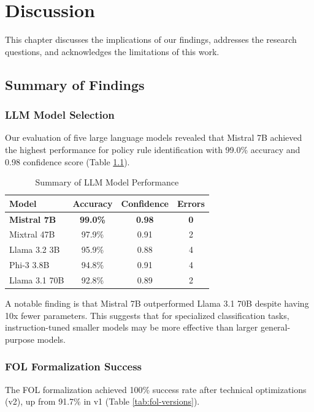 \chapter{Discussion}
\label{ch:discussion}

This chapter discusses the implications of our findings, addresses the research questions, and acknowledges the limitations of this work.

\section{Summary of Findings}

\subsection{LLM Model Selection}

Our evaluation of five large language models revealed that Mistral 7B achieved the highest performance for policy rule identification with 99.0\% accuracy and 0.98 confidence score (Table \ref{tab:model-summary}).

\begin{table}[h]
\centering
\caption{Summary of LLM Model Performance}
\label{tab:model-summary}
\begin{tabular}{|l|c|c|c|}
\hline
\textbf{Model} & \textbf{Accuracy} & \textbf{Confidence} & \textbf{Errors} \\
\hline
\textbf{Mistral 7B} & \textbf{99.0\%} & \textbf{0.98} & \textbf{0} \\
Mixtral 47B & 97.9\% & 0.91 & 2 \\
Llama 3.2 3B & 95.9\% & 0.88 & 4 \\
Phi-3 3.8B & 94.8\% & 0.91 & 4 \\
Llama 3.1 70B & 92.8\% & 0.89 & 2 \\
\hline
\end{tabular}
\end{table}

A notable finding is that Mistral 7B outperformed Llama 3.1 70B despite having 10x fewer parameters. This suggests that for specialized classification tasks, instruction-tuned smaller models may be more effective than larger general-purpose models.

\subsection{FOL Formalization Success}

The FOL formalization achieved 100\% success rate after technical optimizations (v2), up from 91.7\% in v1 (Table \ref{tab:fol-versions}).

